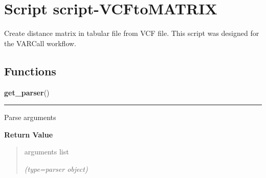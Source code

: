 %
%
%


\section{Script script-VCFtoMATRIX}

    \label{script-VCFtoMATRIX}
Create distance matrix in tabular file from VCF file. This script was 
designed for the VARCall workflow.



  \subsection{Functions}

    \label{script-VCFtoMATRIX:get_parser}

    \vspace{0.5ex}

\hspace{.8\funcindent}\begin{boxedminipage}{\funcwidth}

    \raggedright \textbf{get\_parser}()

    \vspace{-1.5ex}

    \rule{\textwidth}{0.5\fboxrule}
\setlength{\parskip}{2ex}
    Parse arguments

\setlength{\parskip}{1ex}
      \textbf{Return Value}
    \vspace{-1ex}

      \begin{quote}
      arguments list

      {\it (type=parser object)}

      \end{quote}

    \end{boxedminipage}

